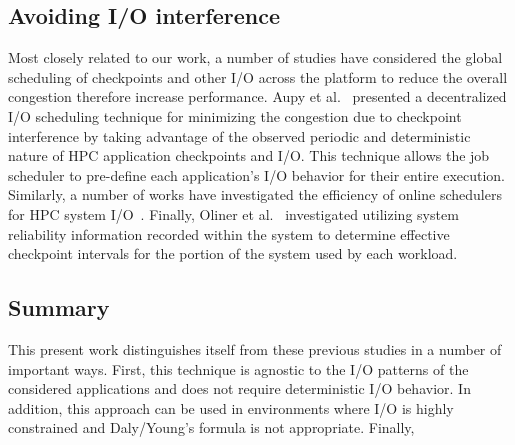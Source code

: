 \subsection{Avoiding I/O interference}

Most closely related to our work, a number of studies have considered the
global scheduling of checkpoints and other I/O across the platform to reduce
the overall congestion therefore increase performance.  Aupy et
al.~\cite{Aupy:2017:Periodic} presented a decentralized I/O scheduling
technique for minimizing the congestion due to checkpoint interference by
taking advantage of the observed periodic and deterministic nature of HPC
application checkpoints and I/O.  This technique allows the job scheduler to
pre-define each application’s I/O behavior for their entire execution.
Similarly, a number of works have investigated the efficiency of online
schedulers for HPC system
I/O~\cite{Dorier2014,Gainaru:2015:Scheduling,Zhou:2015:IOAware}.  Finally,
Oliner et al.~\cite{Oliner:2006:Cooperative} investigated utilizing system
reliability information recorded within the system to determine effective
checkpoint intervals for the portion of the system used by each workload.

\subsection{Summary}

This present work distinguishes itself from these previous studies in a number
of important ways.  First, this technique is agnostic to the I/O patterns of
the considered applications and does not require deterministic I/O behavior.
In addition, this approach can be used in environments where I/O is highly
constrained and Daly/Young's formula is not appropriate.  Finally,
